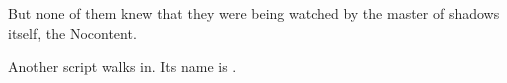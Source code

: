 \documentclass{bubbler}
\begin{document}
\begin{script}


But none of them knew that they were being watched by the master of shadows itself, the Nocontent.

\contop

Another script walks in. Its name is .


\begin{comment}
And Nocontent's assistant, Inacomment.

\andtheirpaltheerrorcommand
\end{comment}

\end{script}
\end{document}
